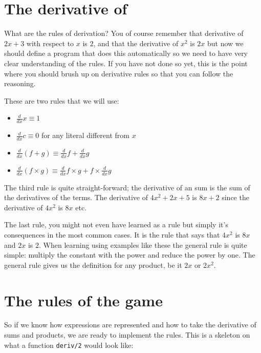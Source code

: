 \documentclass[a4paper,11pt]{article}
\begin{document}
\section{The derivative of}

What are the rules of derivation? You of course remember that derivative
of $2x + 3$ with respect to $x$ is $2$, and that the derivative of
$x^2$ is $2x$ but now we should define a program that does this
automatically so we need to have very clear understanding of the
rules. If you have not done so yet, this is the point where you should
brush up on derivative rules so that you can follow the reasoning.

These are two rules that we will use:

\begin{itemize}
\item $\frac{d}{dx} x \equiv 1$
\item $\frac{d}{dx} c \equiv 0$  for any literal different from $x$
\item $\frac{d}{dx} (f + g) \equiv  \frac{d}{dx} f + \frac{d}{dx} g$
\item $\frac{d}{dx} (f \times  g) \equiv  \frac{d}{dx} f \times  g + f \times \frac{d}{dx} g$
\end{itemize}

\noindent The third rule is quite straight-forward; the derivative of an sum is
the sum of the derivatives of the terms. The derivative of
$4x^{2} + 2x + 5$ is $8x + 2$ since the derivative of $4x^{2}$
is $8x$ etc.

The last rule, you might not even have learned as a rule but simply
it's consequences in the most common cases. It is the rule that says that
$4x^{2}$ is $8x$ and $2x$ is $2$. When learning using examples like these
the general rule is quite simple: multiply the constant with the power
and reduce the power by one. The general rule gives us the definition
for any product, be it $2x$ or $2x^{2}$.



\section{The rules of the game}

So if we know how expressions are represented and how to take the
derivative of sums and products, we are ready to implement the
rules. This is a skeleton on what a function {\tt deriv/2} would look like:
\end{document}
